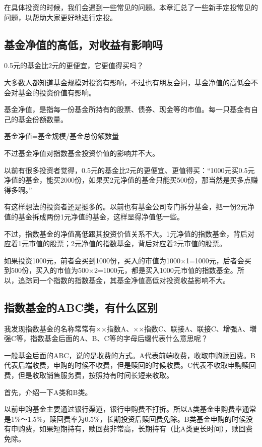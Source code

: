 
\setcounter{figure}{0}\setcounter{table}{0}
在具体投资的时候，我们会遇到一些常见的问题。本章汇总了一些新手定投常见的问题，以帮助大家更好地进行定投。

\subsection{基金净值的高低，对收益有影响吗}
{\kaishu 0.5元的基金比2元的更便宜，它更值得买吗？}

大多数人都知道基金规模对投资有影响，不过也有朋友会问，基金净值的高低会不会对基金的投资价值有影响。

基金净值，是指每一份基金所持有的股票、债券、现金等的市值。每一只基金有自己的基金份额数量。

{\kaishu 基金净值=基金规模/基金总份额数量}

不过基金净值对指数基金投资价值的影响并不大。

以前有很多投资者觉得，0.5元的基金比2元的更便宜、更值得买：“1000元买0.5元净值的基金，能买2000份，如果买2元净值的基金只能买500份，那当然是买多点赚得多啊。”

有这样想法的投资者还是挺多的。以前也有基金公司专门拆分基金，把一份2元净值的基金拆成两份1元净值的基金，这样显得净值低一些。

不过，指数基金的净值高低跟其投资价值关系不大。1元净值的指数基金，背后对应着1元市值的股票；2元净值的指数基金，背后对应着2元市值的股票。

如果投资1000元，前者会买到1000份，买入的市值为1000×1=1000元，后者会买到500份，买入的市值为500×2=1000元，都是买入1000元市值的指数基金。所以，追踪同一个指数的指数基金，其基金净值高低对投资收益影响不大。

\subsection{指数基金的ABC类，有什么区别}
{\kaishu 我发现指数基金的名称常常有××指数A、××指数C、联接A、联接C、增强A、増强C等，指数基金后面的A、B、C等的字母后缀代表什么意思呢？}

一般基金后面的ABC，说的是收费的方式。A代表前端收费，收取申购赎回费。B代表后端收费，申购的时候不收费，但是赎回的时候收费。C代表不收取申购赎回费，但是收取销售服务费，按照持有时间长短来收取。

首先，介绍一下A类和B类。

以前申购基金主要通过银行渠道，银行申购费不打折。所以A类基金申购费率通常是1\%～1.5\%，赎回费率为0.5\%，长期投资后赎回费免除。B类基金申购的时候没有申购费，如果短期持有，赎回费非常高，长期持有（比A类更长时间），赎回费免除。

